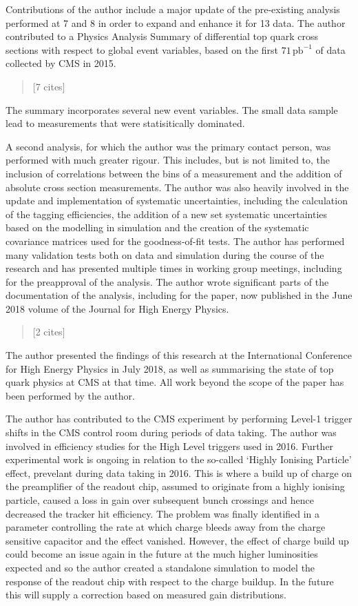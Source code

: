 Contributions of the author include a major update of the pre-existing analysis performed at 7 and 8\TeV{} in order to expand and enhance it for 13\TeV{} data.
The author contributed to a Physics Analysis Summary of differential top quark cross sections with respect to global event variables, based on the first $71\,\mathrm{pb}^{-1}$ of data collected by CMS in 2015.
\begin{quote}
 [7 cites]
\end{quote}
The summary incorporates several new event variables.
The small data sample lead to measurements that were statisitically dominated.

A second analysis, for which the author was the primary contact person, was performed with much greater rigour.
This includes, but is not limited to, the inclusion of correlations between the bins of a measurement and the addition of absolute cross section measurements.
The author was also heavily involved in the update and implementation of systematic uncertainties, including the calculation of the \bquark{} tagging efficiencies, the addition of a new set systematic uncertainties based on the modelling in simulation and the creation of the systematic covariance matrices used for the goodness-of-fit tests. 
The author has performed many validation tests both on data and simulation during the course of the research and has presented multiple times in working group meetings, including for the preapproval of the analysis.
The author wrote significant parts of the documentation of the analysis, including for the paper, now published in the June 2018 volume of the Journal for High Energy Physics.
\begin{quote}
 [2 cites]
\end{quote}
The author presented the findings of this research at the International Conference for High Energy Physics in July 2018, as well as summarising the state of top quark physics at CMS at that time.
All work beyond the scope of the paper has been performed by the author.

The author has contributed to the CMS experiment by performing Level-1 trigger shifts in the CMS control room during periods of data taking.
The author was involved in efficiency studies for the High Level triggers used in 2016.
Further experimental work is ongoing in relation to the so-called `Highly Ionising Particle' effect, prevelant during data taking in 2016.
This is where a build up of charge on the preamplifier of the readout chip, assumed to originate from a highly ionising particle, caused a loss in gain over subsequent bunch crossings and hence decreased the tracker hit efficiency.
The problem was finally identified in a parameter controlling the rate at which charge bleeds away from the charge sensitive capacitor and the effect vanished.
However, the effect of charge build up could become an issue again in the future at the much higher luminosities expected and so the author created a standalone simulation to model the response of the readout chip with respect to the charge buildup.
In the future this will supply a correction based on measured gain distributions. 

